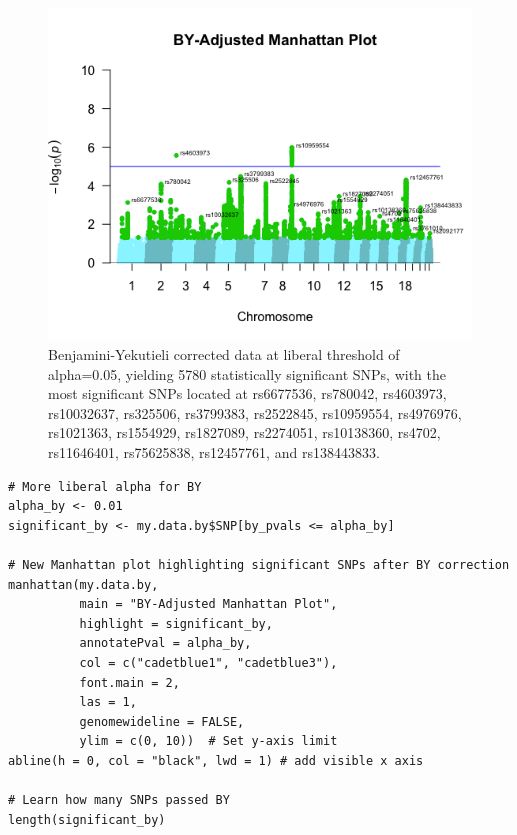 \documentclass[12pt]{article}
\begin{document}
\begin{figure}
    \centering
    \includegraphics[width=1\linewidth]{Thesis_BYCorrectedManhattanPlot.png}
    \caption{Benjamini-Yekutieli corrected data at liberal threshold of alpha=0.05, yielding 5780 statistically significant SNPs, with the most significant SNPs located at rs6677536, rs780042, rs4603973, rs10032637, rs325506, rs3799383, rs2522845, rs10959554, rs4976976, rs1021363, rs1554929, rs1827089, rs2274051, rs10138360, rs4702, rs11646401, rs75625838, rs12457761, and rs138443833.}
    \label{fig:enter-label}
\end{figure}
\clearpage

\begin{lstlisting}[style=Rstyle]
# More liberal alpha for BY
alpha_by <- 0.01
significant_by <- my.data.by$SNP[by_pvals <= alpha_by]

# New Manhattan plot highlighting significant SNPs after BY correction
manhattan(my.data.by,
          main = "BY-Adjusted Manhattan Plot",
          highlight = significant_by,
          annotatePval = alpha_by,
          col = c("cadetblue1", "cadetblue3"),
          font.main = 2,
          las = 1,
          genomewideline = FALSE,
          ylim = c(0, 10))  # Set y-axis limit
abline(h = 0, col = "black", lwd = 1) # add visible x axis

# Learn how many SNPs passed BY
length(significant_by)
\end{lstlisting}
\end{document}
